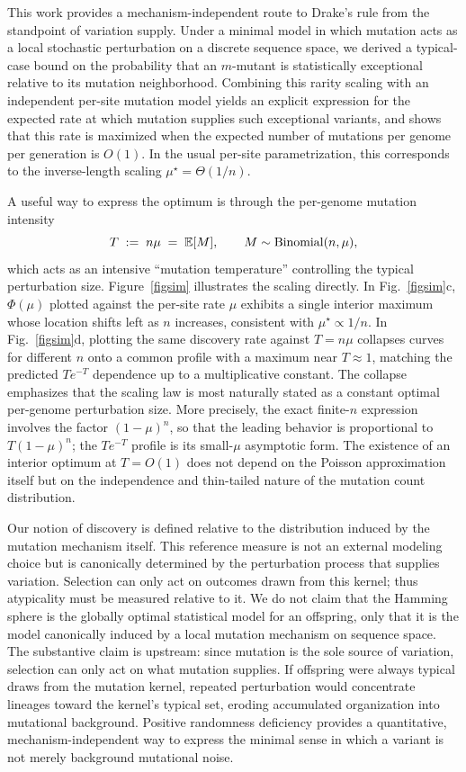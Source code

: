 \documentclass[9pt,twocolumn,oneside]{pnas-new}
\begin{document}
This work provides a mechanism-independent route to Drake's rule from the standpoint of variation supply. Under a minimal model in which mutation acts as a local stochastic perturbation on a discrete sequence space, we derived a typical-case bound on the probability that an $m$-mutant is statistically exceptional relative to its mutation neighborhood. Combining this rarity scaling with an independent per-site mutation model yields an explicit expression for the expected rate at which mutation supplies such exceptional variants, and shows that this rate is maximized when the expected number of mutations per genome per generation is $O(1)$. In the usual per-site parametrization, this corresponds to the inverse-length scaling $\mu^\star=\Theta(1/n)$.

A useful way to express the optimum is through the per-genome mutation intensity
\[
T \;:=\; n\mu \;=\; \mathbb{E}[M],\qquad M\sim{\rm Binomial}(n,\mu),
\]
which acts as an intensive ``mutation temperature'' controlling the typical perturbation size. Figure~\ref{figsim} illustrates the scaling directly.
In Fig.~\ref{figsim}c, $\Phi(\mu)$ plotted against the per-site rate $\mu$ exhibits a single interior maximum whose location shifts left as $n$ increases, consistent with $\mu^\star\propto 1/n$. In Fig.~\ref{figsim}d, plotting the same discovery rate against $T=n\mu$ collapses curves for different $n$ onto a common profile with a maximum near $T\approx 1$, matching the predicted $Te^{-T}$ dependence up to a multiplicative constant.
The collapse emphasizes that the scaling law is most naturally stated as a constant optimal per-genome perturbation size.
More precisely, the exact finite-$n$ expression involves the factor $(1-\mu)^n$, so that the leading behavior is proportional to $T(1-\mu)^n$; the  $T e^{-T}$ profile is its small-$\mu$ asymptotic form. The existence of an interior optimum at $T=O(1)$ does not depend on the Poisson approximation itself but on the independence and thin-tailed nature of the mutation count distribution.

Our notion of discovery is defined relative to the distribution induced by the mutation mechanism itself. This reference measure is not an external modeling choice but is canonically determined by the perturbation process that supplies variation. Selection can only act on outcomes drawn from this kernel; thus atypicality must be measured relative to it.  We do not claim that the Hamming sphere is the globally optimal statistical model for an offspring, only that it is the model canonically induced by a local mutation mechanism on sequence space. The substantive claim is upstream: since mutation is the sole source of variation, selection can only act on what mutation supplies. If offspring were always typical draws from the mutation kernel, repeated perturbation would concentrate lineages toward the kernel's typical set, eroding accumulated organization into mutational background. Positive randomness deficiency provides a quantitative, mechanism-independent way to express the minimal sense in which a variant is not merely background mutational noise.
\end{document}
